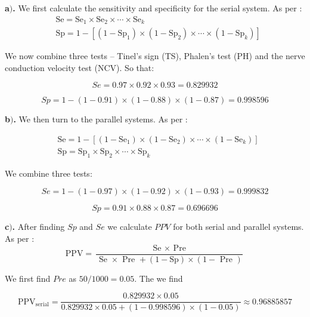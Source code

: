 \documentclass[a4 paper]{article}
\begin{document}
	




\textbf{a$)$.} We first calculate the sensitivity and 
specificity for the serial system. As per \cite{stat}:
$$
\begin{aligned}
&\mathrm{Se}=\mathrm{Se}_{1} \times \mathrm{Se}_{2} \times \cdots \times \mathrm{Se}_{k}\\
&\mathrm{Sp}=1-\left[\left(1-\mathrm{Sp}_{1}\right) \times\left(1-\mathrm{Sp}_{2}\right) \times \cdots \times\left(1-\mathrm{Sp}_{k}\right)\right]
\end{aligned}
$$

We now combine three tests -- Tinel's sign (TS), 
Phalen's test (PH) and
the nerve conduction velocity test (NCV). So that:

$$
Se = 0.97 \times 0.92 \times 0.93 = ‭0.829932‬
$$

$$
Sp = 1 - (1 - 0.91) \times (1 - 0.88) \times (1 - 0.87) = 0.998596
$$


\textbf{b$)$.} We then turn to the parallel systems. 
As per \cite{stat}:

$$
\begin{aligned}
&\mathrm{Se}=1-\left[\left(1-\mathrm{Se}_{1}\right) \times\left(1-\mathrm{Se}_{2}\right) \times \cdots \times\left(1-\mathrm{Se}_{k}\right)\right]\\
&\mathrm{Sp}=\mathrm{Sp}_{1} \times \mathrm{Sp}_{2} \times \cdots \times \mathrm{Sp}_{k}
\end{aligned}
$$

We combine three tests:

$$
Se = 1 - (1 - 0.97) \times (1 - 0.92) \times (1 - 0.93) = 0.999832 ‭
$$

$$
Sp = 0.91 \times 0.88 \times 0.87 = 0.696696
$$




\textbf{c$)$.} After finding $Sp$ and $Se$ we calculate $PPV$
for both serial and parallel systems. As per \cite{stat}:
$$
\mathrm{PPV}=\frac{\text { Se } \times \text { Pre }}{\text { Se } \times \text { Pre }+(1-\mathrm{Sp}) \times(1-\text { Pre })}
$$

We first find $Pre$ as $50/1000=0.05$. The we find

$$
\mathrm{PPV_{serial}}=\frac{‭0.829932‬ \times 0.05}
{‭0.829932 \times 0.05 + (1-0.998596) \times (1-0.05)} \approx 0.96885857
$$
\end{document}
